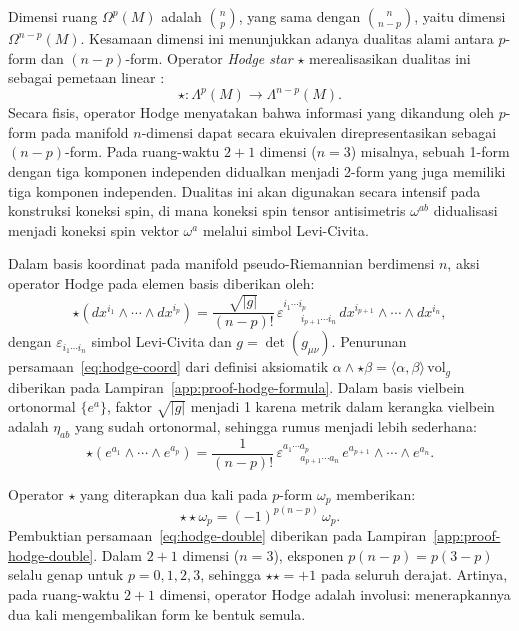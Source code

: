 Dimensi ruang $\Omega^p(M)$ adalah $\binom{n}{p}$, yang sama dengan $\binom{n}{n-p}$, yaitu dimensi $\Omega^{n-p}(M)$. Kesamaan dimensi ini menunjukkan adanya dualitas alami antara $p$-form dan $(n-p)$-form. Operator \textit{Hodge star} $\star$ merealisasikan dualitas ini sebagai pemetaan linear \cite{eguchi1980, nakahara2003geometry}:
\begin{equation}
    \star : \Lambda^p(M) \longrightarrow \Lambda^{n-p}(M).
\end{equation}
Secara fisis, operator Hodge menyatakan bahwa informasi yang dikandung oleh $p$-form pada manifold $n$-dimensi dapat secara ekuivalen direpresentasikan sebagai $(n-p)$-form. Pada ruang-waktu $2+1$ dimensi ($n=3$) misalnya, sebuah 1-form dengan tiga komponen independen didualkan menjadi 2-form yang juga memiliki tiga komponen independen. Dualitas ini akan digunakan secara intensif pada konstruksi koneksi spin, di mana koneksi spin tensor antisimetris $\omega^{ab}$ didualisasi menjadi koneksi spin vektor $\omega^a$ melalui simbol Levi-Civita.

Dalam basis koordinat pada manifold pseudo-Riemannian berdimensi $n$, aksi operator Hodge pada elemen basis diberikan oleh:
\begin{equation}\label{eq:hodge-coord}
    \star(dx^{i_1} \wedge \cdots \wedge dx^{i_p}) = \frac{\sqrt{|g|}}{(n-p)!}\, \varepsilon^{i_1 \cdots i_p}_{\ \ \ \ \ \ \ \ i_{p+1} \cdots i_n}\, dx^{i_{p+1}} \wedge \cdots \wedge dx^{i_n},
\end{equation}
dengan $\varepsilon_{i_1 \cdots i_n}$ simbol Levi-Civita dan $g = \det(g_{\mu\nu})$. Penurunan persamaan~\eqref{eq:hodge-coord} dari definisi aksiomatik $\alpha \wedge \star\beta = \langle\alpha,\beta\rangle\,\mathrm{vol}_g$ diberikan pada Lampiran~\ref{app:proof-hodge-formula}. Dalam basis vielbein ortonormal $\{e^a\}$, faktor $\sqrt{|g|}$ menjadi 1 karena metrik dalam kerangka vielbein adalah $\eta_{ab}$ yang sudah ortonormal, sehingga rumus menjadi lebih sederhana:
\begin{equation}\label{eq:hodge-frame}
    \star(e^{a_1} \wedge \cdots \wedge e^{a_p}) = \frac{1}{(n-p)!}\, \varepsilon^{a_1 \cdots a_p}_{\ \ \ \ \ \ \ \ a_{p+1} \cdots a_n}\, e^{a_{p+1}} \wedge \cdots \wedge e^{a_n}.
\end{equation}

Operator $\star$ yang diterapkan dua kali pada $p$-form $\omega_p$ memberikan:
\begin{equation}\label{eq:hodge-double}
    \star\star\omega_p = (-1)^{p(n-p)}\,\omega_p.
\end{equation}
Pembuktian persamaan~\eqref{eq:hodge-double} diberikan pada Lampiran~\ref{app:proof-hodge-double}. Dalam $2+1$ dimensi ($n = 3$), eksponen $p(n-p) = p(3-p)$ selalu genap untuk $p = 0, 1, 2, 3$, sehingga $\star\star = +1$ pada seluruh derajat. Artinya, pada ruang-waktu $2+1$ dimensi, operator Hodge adalah involusi: menerapkannya dua kali mengembalikan form ke bentuk semula.


